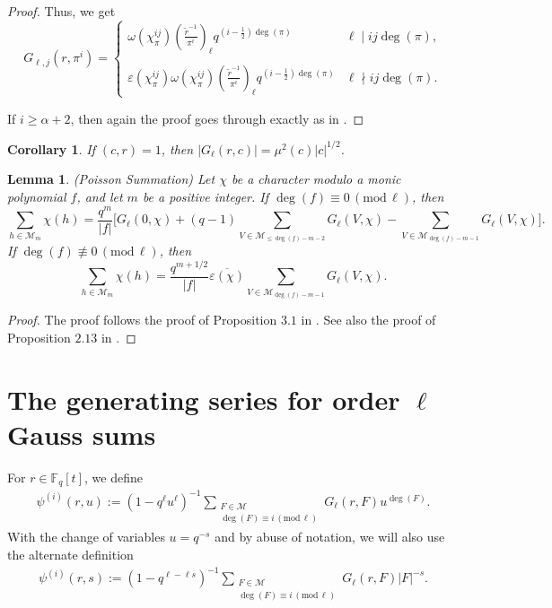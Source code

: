 \documentclass[12pt]{amsart}
\newtheorem{lemma}[theorem]{Lemma}
\newtheorem{corollary}[theorem]{Corollary}
\newcommand{\F}{\mathbb{F}}
\renewcommand{\pmod}[1]{\,(\mathrm{mod}\,#1)}
\def\cM{\mathcal{M}}
\newcommand{\legl}[2]{\left( \frac{#1}{#2} \right)_\ell}
\begin{document}
\begin{proof}
Thus, we get 
\[G_{\ell,j}(r, \pi^i) = \left\{\begin{array}{ll}\omega(\chi_\pi^{ij}) \legl{\tilde{r}^{-1}}{\pi^i}  q^{(i-\frac{1}{2})\deg(\pi) }   &\ell \mid ij\deg(\pi),\\ \\ \varepsilon(\chi_\pi^{ij}) \omega(\chi_\pi^{ij}) \legl{\tilde{r}^{-1}}{\pi^i}  q^{(i-\frac{1}{2})\deg(\pi) }   &\ell \nmid ij \deg(\pi). \end{array} \right.\]



If $ i \geq \alpha+2$, then again the proof goes through exactly as in \cite{Florea1}.
\end{proof}

\begin{corollary} \label{size-GS} If $(c, r)=1$, then $|G_\ell(r, c)| = \mu^2(c) |c|^{1/2}$.
\end{corollary}


\begin{lemma} (Poisson Summation)
\label{poisson}Let $\chi$ be a character modulo a monic polynomial $f$, and let $m$ be a positive integer.
If $\deg(f) \equiv 0 \pmod \ell$, then
$$\sum_{h \in \mathcal{M}_m} \chi(h) = \frac{q^m}{|f|} \Big[  G_{\ell}(0,\chi)+ (q-1) \sum_{V \in \mathcal{M}_{\leq \deg(f)-m-2}} G_{\ell}(V,\chi) - \sum_{V \in \mathcal{M}_{\deg(f)-m-1}} G_{\ell}(V,\chi)\Big].$$
If $\deg(f) \not\equiv 0 \pmod \ell$,  then 
$$\sum_{h \in \mathcal{M}_m} \chi(h)= \frac{q^{m+1/2}}{|f|} \overline{\varepsilon(\chi)} \sum_{V \in \mathcal{M}_{\deg(f)-m-1}} G_{\ell}(V,\chi).$$
\end{lemma}


\begin{proof}
The proof follows the proof of Proposition $3.1$ in \cite{Florea1}. See also the proof of Proposition $2.13$ in \cite{DFL}.
\end{proof}
\section{The generating series for order $\ell$ Gauss sums}
\label{gen-series}
For $r \in \F_q[t]$, we define
\begin{align*}
 \psi^{(i)}(r,u)  := (1-q^{\ell}u^\ell)^{-1}\sum_{\substack{F \in \cM\\ \deg(F) \equiv i \pmod{\ell}}} G_\ell(r, F) u^{\deg(F)}.
\end{align*}
With the change of variables $u=q^{-s}$ and by abuse of notation, we will also use the alternate definition
\begin{align*}
 \psi^{(i)}(r,s)  := (1-q^{\ell-\ell s})^{-1}\sum_{\substack{F \in \cM\\ \deg(F) \equiv i \pmod{\ell}}} G_\ell(r, F) |F|^{-s}.
\end{align*}
\end{document}
